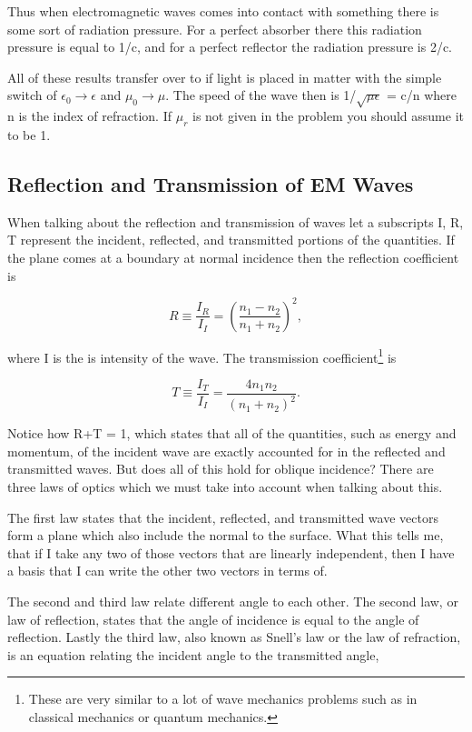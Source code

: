 \documentclass[preprint, review,12pt]{elsarticle}
\def\={\equiv}
\begin{document}
Thus when electromagnetic waves comes into contact with something there is some sort of radiation pressure. For a perfect absorber there this radiation pressure is equal to 1/c, and for a perfect reflector the radiation pressure is 2/c.

All of these results transfer over to if light is placed in matter with the simple switch of $\epsilon_0 \rightarrow \epsilon$ and $\mu_0 \rightarrow \mu.$ The speed of the wave then is 1/$\sqrt{\mu \epsilon}$ = c/n where n is the index of refraction. If $\mu_r$ is not given in the problem you should assume it to be 1.

\subsection{Reflection and Transmission of EM Waves}

When talking about the reflection and transmission of waves let a subscripts I, R, T represent the incident, reflected, and transmitted portions of the quantities. If the plane comes at a boundary at normal incidence then the reflection coefficient is 

\begin{equation}
    R \= \frac{I_R}{I_I} = (\frac{n_1 - n_2}{n_1+ n_2})^2,
\end{equation}

where I is the is intensity of the wave. The transmission coefficient\footnote{These are very similar to a lot of wave mechanics problems such as in classical mechanics or quantum mechanics.} is

\begin{equation}
    T \= \frac{I_T}{I_I} = \frac{4n_1n_2}{(n_1 + n_2)^2}.
\end{equation}

Notice how R+T = 1, which states that all of the quantities, such as energy and momentum, of the incident wave are exactly accounted for in the reflected and transmitted waves. But does all of this hold for oblique incidence? There are three laws of optics which we must take into account when talking about this.

The first law states that the incident, reflected, and transmitted wave vectors form a plane which also include the normal to the surface. What this tells me, that if I take any two of those vectors that are linearly independent, then I have a basis that I can write the other two vectors in terms of.

The second and third law relate different angle to each other. The second law, or law of reflection, states that the angle of incidence is equal to the angle of reflection. Lastly the third law, also known as Snell's law or the law of refraction, is an equation relating the incident angle to the transmitted angle,
\end{document}

